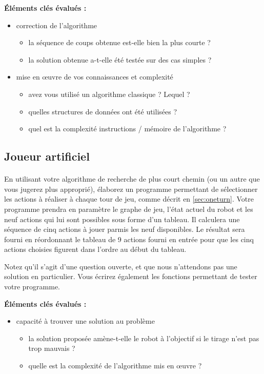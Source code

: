 \documentclass[a4paper]{article}
\begin{document}
\vspace{3mm}
\noindent\textbf{Éléments clés évalués : }
\begin{itemize}
  \item correction de l'algorithme
    \begin{itemize}
      \item la séquence de coups obtenue est-elle bien la plus courte ?
      \item la solution obtenue a-t-elle été testée sur des cas simples ?
    \end{itemize}
  \item mise en œuvre de vos connaissances et complexité
    \begin{itemize}
      \item avez vous utilisé un algorithme classique ? Lequel ?
      \item quelles structures de données ont été utilisées ?
      \item quel est la complexité instructions / mémoire de l'algorithme ?
    \end{itemize}
\end{itemize}

\subsection{Joueur artificiel}

\paragraph{}En utilisant votre algorithme de recherche de plus court chemin (ou
un autre que vous jugerez plus approprié), élaborez un programme permettant de
sélectionner les actions à réaliser à chaque tour de jeu, comme décrit en
\autoref{sec:oneturn}. Votre programme prendra en paramètre le graphe de jeu,
l'état actuel du robot et les neuf actions qui lui sont possibles sous forme
d'un tableau. Il calculera une séquence de cinq actions à jouer parmis les neuf
disponibles. Le résultat sera fourni en réordonnant le tableau de 9 actions
fourni en entrée pour que les cinq actions choisies figurent dans l'ordre au
début du tableau. 

Notez qu'il s'agit d'une question ouverte, et que nous n'attendons pas une
solution en particulier. Vous écrirez également les fonctions permettant de
tester votre programme.

\vspace{3mm}
\noindent\textbf{Éléments clés évalués :}
\begin{itemize}
  \item capacité à trouver une solution au problème
    \begin{itemize}
      \item la solution proposée amène-t-elle le robot à l'objectif si le tirage
        n'est pas trop mauvais ?
      \item quelle est la complexité de l'algorithme mis en œuvre ?
    \end{itemize}
\end{itemize}
\end{document}
